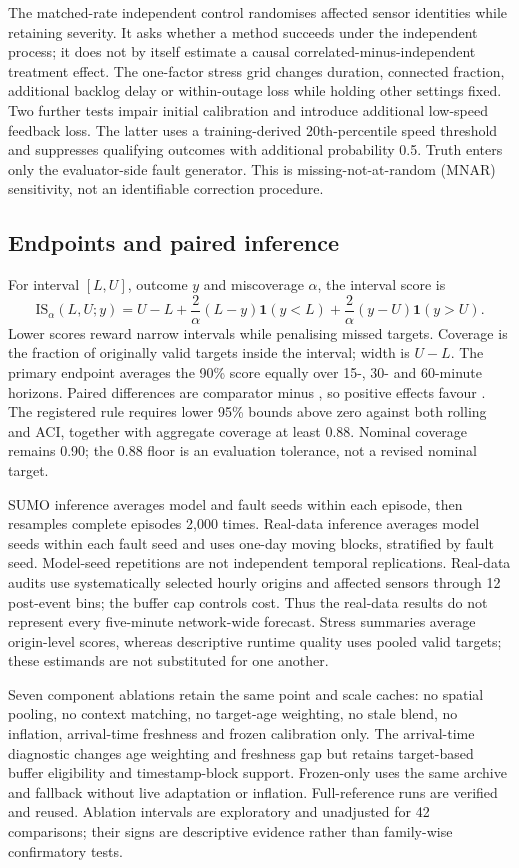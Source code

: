 The matched-rate independent control randomises affected sensor identities while retaining severity. It asks whether a method succeeds under the independent process; it does not by itself estimate a causal correlated-minus-independent treatment effect. The one-factor stress grid changes duration, connected fraction, additional backlog delay or within-outage loss while holding other settings fixed. Two further tests impair initial calibration and introduce additional low-speed feedback loss. The latter uses a training-derived 20th-percentile speed threshold and suppresses qualifying outcomes with additional probability 0.5. Truth enters only the evaluator-side fault generator. This is missing-not-at-random (MNAR) sensitivity, not an identifiable correction procedure.

\subsection{Endpoints and paired inference}
For interval $[L,U]$, outcome $y$ and miscoverage $\alpha$, the interval score is
\begin{equation}
\mathrm{IS}_{\alpha}(L,U;y)=U-L+\frac{2}{\alpha}(L-y)\mathbf1(y<L)+\frac{2}{\alpha}(y-U)\mathbf1(y>U).
\end{equation}
Lower scores reward narrow intervals while penalising missed targets. Coverage is the fraction of originally valid targets inside the interval; width is $U-L$. The primary endpoint averages the 90\% score equally over 15-, 30- and 60-minute horizons. Paired differences are comparator minus \FAR{}, so positive effects favour \FAR{}. The registered rule requires lower 95\% bounds above zero against both rolling and ACI, together with aggregate coverage at least 0.88. Nominal coverage remains 0.90; the 0.88 floor is an evaluation tolerance, not a revised nominal target.

SUMO inference averages model and fault seeds within each episode, then resamples complete episodes 2,000 times. Real-data inference averages model seeds within each fault seed and uses one-day moving blocks, stratified by fault seed. Model-seed repetitions are not independent temporal replications. Real-data audits use systematically selected hourly origins and affected sensors through 12 post-event bins; the buffer cap controls cost. Thus the real-data results do not represent every five-minute network-wide forecast. Stress summaries average origin-level scores, whereas descriptive runtime quality uses pooled valid targets; these estimands are not substituted for one another.

Seven component ablations retain the same point and scale caches: no spatial pooling, no context matching, no target-age weighting, no stale blend, no inflation, arrival-time freshness and frozen calibration only. The arrival-time diagnostic changes age weighting and freshness gap but retains target-based buffer eligibility and timestamp-block support. Frozen-only uses the same archive and fallback without live adaptation or inflation. Full-reference runs are verified and reused. Ablation intervals are exploratory and unadjusted for 42 comparisons; their signs are descriptive evidence rather than family-wise confirmatory tests.

